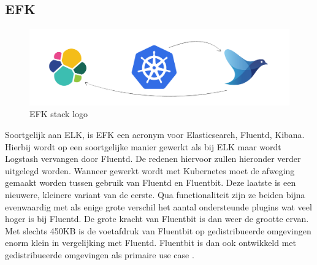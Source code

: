 \subsection{EFK}

\begin{figure}[ht]
    \centering
    \includegraphics[scale=0.15 ]{img/EFK_logo}
    \caption[EFK stack logo]{EFK stack logo \cite{petrausch}}
\end{figure}

Soortgelijk aan ELK, is EFK een acronym voor Elasticsearch, Fluentd, Kibana. Hierbij wordt op een soortgelijke manier gewerkt als bij ELK maar wordt Logstash vervangen door Fluentd. De redenen hiervoor zullen hieronder verder uitgelegd worden. Wanneer gewerkt wordt met Kubernetes moet de afweging gemaakt worden tussen gebruik van Fluentd en Fluentbit. Deze laatste is een nieuwere, kleinere variant van de eerste. Qua functionaliteit zijn ze beiden bijna evenwaardig met als enige grote verschil het aantal ondersteunde plugins wat veel hoger is bij Fluentd. De grote kracht van Fluentbit is dan weer de grootte ervan. Met slechts 450KB is de voetafdruk van Fluentbit op gedistribueerde omgevingen enorm klein in vergelijking met Fluentd. Fluentbit is dan ook ontwikkeld met gedistribueerde omgevingen als primaire use case \autocite{berman2018-06}.

